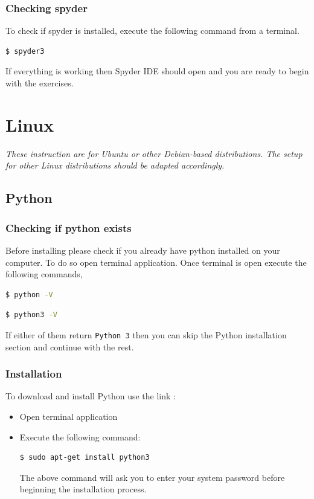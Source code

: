 \documentclass{cmc}
\begin{document}
\subsubsection{Checking spyder}
\label{sec-mac:checking-if-spyder}

To check if spyder is installed, execute the following command from a
terminal.

\begin{lstlisting}[language=bash]
$ spyder3
\end{lstlisting}

If everything is working then Spyder IDE should open and you are ready
to begin with the exercises.

\newpage
\section{Linux}
\label{sec:lin}

\textbf{}\textit{These instruction are for Ubuntu or
  other Debian-based distributions. The setup for other Linux
  distributions should be adapted accordingly.}

\subsection{Python}
\label{sec-lin:python}
\subsubsection{Checking if python exists}
\label{sec-lin:checking-if-python}
Before installing please check if you already have python installed on
your computer. To do so open terminal application.  Once terminal is
open execute the following commands,
\begin{lstlisting}[language=bash]
$ python -V
\end{lstlisting}
\begin{lstlisting}[language=bash]
$ python3 -V
\end{lstlisting}

If either of them return \verb|Python 3| then you can skip the Python
installation section and continue with the rest.

\subsubsection{Installation}
\label{sec-lin:installation-python}

To download and install Python use the link :
\begin{itemize}
\item Open terminal application
\item Execute the following command:
\begin{lstlisting}[language=bash]
$ sudo apt-get install python3
\end{lstlisting}
  The above command will ask you to enter your system password before
  beginning the installation process.
\end{itemize}
\end{document}
